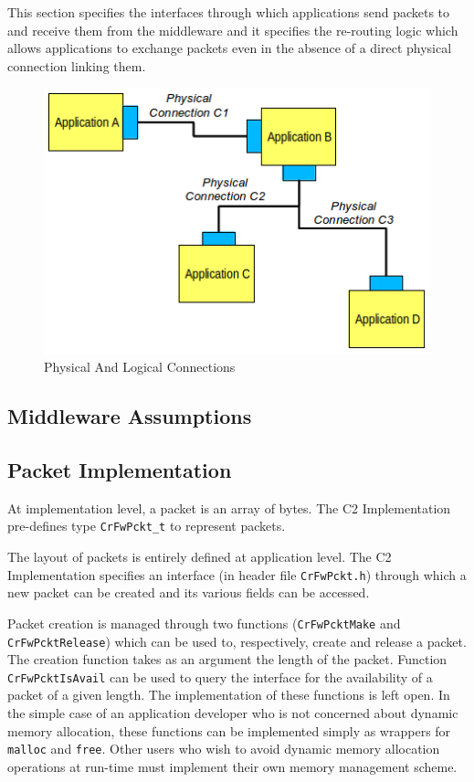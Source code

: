 \documentclass[a4paper,10pt]{article}
\begin{document}
This section specifies the interfaces through which applications send packets to and receive them from the middleware and it specifies the re-routing logic which allows applications to exchange packets even in the absence of a direct physical connection linking them. 

\begin{figure}[ht]
 \centering
 \includegraphics[scale=0.45,keepaspectratio=true]{PhysicalAndLogicalConnections.png}
 \caption{Physical And Logical Connections}
 \label{fig:PhysicalAndLogicalConnections}
\end{figure} 

\subsection{Middleware Assumptions}\label{sec:MwAssumptions}
 

\subsection{Packet Implementation}\label{sec:PcktImpl}

At implementation level, a packet is an array of bytes. The C2 Implementation pre-defines type \texttt{CrFwPckt\_t} to represent packets.

The layout of packets is entirely defined at application level. The C2 Implementation specifies an interface (in header file \texttt{CrFwPckt.h}) through which a new packet can be created and its various fields can be accessed. 

Packet creation is managed through two functions (\texttt{CrFwPcktMake} and \texttt{CrFwPcktRelease}) which can be used to, respectively, create and release a packet. The creation function takes as an argument the length of the packet. Function \texttt{CrFwPcktIsAvail} can be used to query the interface for the availability of a packet of a given length. The implementation of these functions is left open. In the simple case of an application developer who is not concerned about dynamic memory allocation, these functions can be implemented simply as wrappers for \texttt{malloc} and \texttt{free}. Other users who wish to avoid dynamic memory allocation operations at run-time must implement their own memory management scheme.
\end{document}
